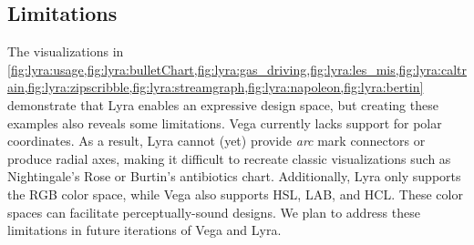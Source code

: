 \clearpage

\subsection{Limitations}

The visualizations in
\cref{fig:lyra:usage,fig:lyra:bulletChart,fig:lyra:gas_driving,fig:lyra:les_mis,fig:lyra:caltrain,fig:lyra:zipscribble,fig:lyra:streamgraph,fig:lyra:napoleon,fig:lyra:bertin}
demonstrate that Lyra enables an expressive design space, but creating these
examples also reveals some limitations. Vega currently lacks support for polar
coordinates. As a result, Lyra cannot (yet) provide \emph{arc} mark connectors
or produce radial axes, making it difficult to recreate classic visualizations
such as Nightingale's Rose or Burtin's antibiotics chart. Additionally, Lyra
only supports the RGB color space, while Vega also supports HSL, LAB, and HCL.
These color spaces can facilitate perceptually-sound designs. We plan to address
these limitations in future iterations of Vega and Lyra.